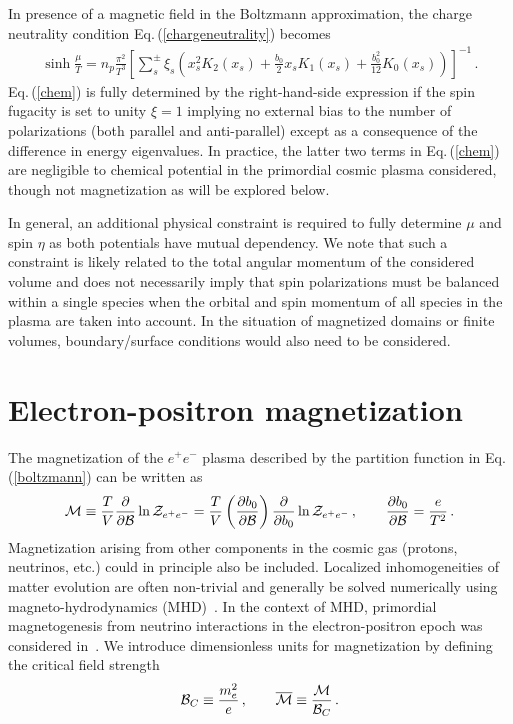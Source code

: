 \documentclass[a4paper]{article}
\newcommand{\req}[1]{Eq.\,(\ref{#1})}
\newcommand*{\xblue}{\color{black}}
\begin{document}
In presence of a magnetic field in the Boltzmann approximation, the charge neutrality condition \req{chargeneutrality} becomes
\begin{align}
    \label{chem}
    \sinh{\frac{\mu}{T}}=n_{p}\frac{\pi^{2}}{T^{3}}\left[\sum_{s}^{\pm}\xi_{s}\left(x_{s}^{2}K_{2}(x_{s})+\frac{b_{0}}{2}x_{s}K_{1}(x_{s})+\frac{b_{0}^{2}}{12}K_{0}(x_{s})\right)\right]^{-1}\,.
\end{align}
\req{chem} is fully determined by the right-hand-side expression if the spin fugacity is set to unity $\xi=1$ implying {\xblue no external bias to the number of polarizations (both parallel and anti-parallel) except as a consequence of the difference in energy eigenvalues. In practice, the latter two terms in \req{chem} are negligible to chemical potential in the primordial cosmic plasma considered, though not magnetization as will be explored below.}

In general, an additional physical constraint is required to fully determine $\mu$ and spin $\eta$ as both potentials have mutual dependency. We note that such a constraint is likely related to the total angular momentum of the considered volume and does not necessarily imply that spin polarizations must be balanced within a single species when the orbital and spin momentum of all species in the plasma are taken into account. {\xblue In the situation of magnetized domains or finite volumes, boundary/surface conditions would also need to be considered.}
\section{Electron-positron magnetization}
\label{sec:magnetization}
\noindent The magnetization of the $e^{+}e^{-}$ plasma described by the partition function in \req{boltzmann} can be written as
\begin{align}
    \label{defmagetization}
    {\cal M}\equiv\frac{T}{V}\frac{\partial}{\partial{\cal B}}\ln{{\cal Z}_{e^{+}e^{-}}} = \frac{T}{V}\left(\frac{\partial b_{0}}{\partial{\cal B}}\right)\frac{\partial}{\partial b_{0}}\ln{{\cal Z}_{e^{+}e^{-}}}\,,\qquad\frac{\partial b_{0}}{\partial{\cal B}}=\frac{e}{T^{2}}\,.
\end{align}
Magnetization arising from other components in the cosmic gas (protons, neutrinos, etc.) could in principle also be included. Localized inhomogeneities of matter evolution are often non-trivial and generally be solved numerically using magneto-hydrodynamics (MHD)~\cite{melrose2008quantum,vazza2017simulations}. In the context of MHD, primordial magnetogenesis from neutrino interactions in the electron-positron epoch was considered in~\cite{perrone2021neutrinoelectron}. We introduce dimensionless units for magnetization by defining the critical field strength
\begin{align}
    {\cal B}_{C}\equiv\frac{m_{e}^{2}}{e}\,,\qquad{\overline{\cal M}}\equiv\frac{\cal M}{{\cal B}_{C}}\,.
\end{align}
\end{document}
